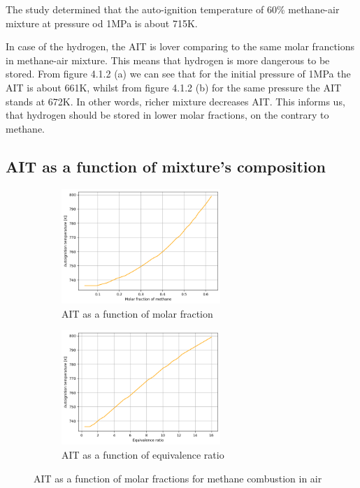 \documentclass[a4paper,11pt]{article}
\begin{document}
The study determined that the auto-ignition temperature of 60\% methane-air mixture at pressure od 1MPa is about 715K.\par
	In case of the hydrogen, the AIT is lover comparing to the same molar franctions in methane-air mixture. This means that hydrogen is more dangerous to be stored. From figure 4.1.2 (a) we can see that for the initial pressure of 1MPa the AIT is about 661K, whilst from figure 4.1.2 (b) for the same pressure the AIT stands at 672K. In other words, richer mixture decreases AIT. This informs us, that hydrogen should be stored in lower molar fractions, on the contrary to methane.\par

\subsection{AIT as a function of mixture's composition}

\begin{figure}[h]
\begin{subfigure}{.5\textwidth}
\centering
\includegraphics[width=6cm]{2metan.png}
\caption{AIT as a function of molar fraction}
\end{subfigure}
\begin{subfigure}{.5\textwidth}
\centering
\includegraphics[width=6cm]{3metan.png}
\caption{AIT as a function of equivalence ratio}
\end{subfigure}
\caption{AIT as a function of molar fractions for methane combustion in air}
\end{figure}
\end{document}

